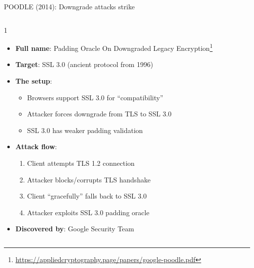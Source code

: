 \documentclass[aspectratio=169, lualatex, handout]{beamer}
\begin{document}
\begin{frame}{POODLE (2014): Downgrade attacks strike}
	\begin{columns}[c]
		\begin{column}{1\textwidth}
			\begin{itemize}[<+->]
				\item \textbf{Full name}: Padding Oracle On Downgraded Legacy Encryption\footnote{\url{https://appliedcryptography.page/papers/google-poodle.pdf}}
				\item \textbf{Target}: SSL 3.0 (ancient protocol from 1996)
				\item \textbf{The setup}:
				      \begin{itemize}
					      \item Browsers support SSL 3.0 for ``compatibility''
					      \item Attacker forces downgrade from TLS to SSL 3.0
					      \item SSL 3.0 has weaker padding validation
				      \end{itemize}
				\item \textbf{Attack flow}:
				      \begin{enumerate}
					      \item Client attempts TLS 1.2 connection
					      \item Attacker blocks/corrupts TLS handshake
					      \item Client ``gracefully'' falls back to SSL 3.0
					      \item Attacker exploits SSL 3.0 padding oracle
				      \end{enumerate}
				\item \textbf{Discovered by}: Google Security Team
			\end{itemize}
		\end{column}
	\end{columns}
\end{frame}
\end{document}
